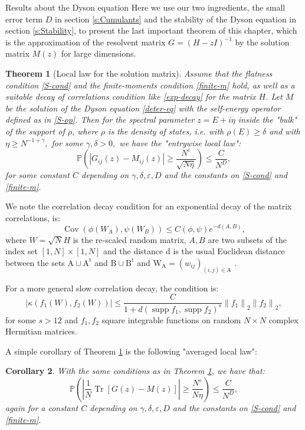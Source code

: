\documentclass[11pt, a4paper, oneside]{book}
\numberwithin{equation}{chapter}
\newcommand{\beq}{\begin{equation}}
\newcommand{\eeq}{\end{equation}}
\newtheorem{thm}{Theorem}[section]
\newtheorem{cor}[thm]{Corollary}
\begin{document}
\begin{section}{Results about the Dyson equation}
Here we use our two ingredients, the small error term $D$ in section \ref{s:Cumulants} and the stability of the Dyson equation in section \ref{s:Stability}, to present the last important theorem of this chapter, which is the approximation of the resolvent matrix $G = (H-zI)^{-1}$ by the solution matrix $M(z)$ for large dimensions.
%
\begin{thm}[Local law for the solution matrix] \label{local-entry}
    Assume that the flatness condition \eqref{S-cond} and the finite-moments condition \eqref{finite-m} hold, as well as a suitable decay of correlations condition like \eqref{exp-decay} for the matrix $H$. Let $M$ be the solution of the Dyson equation \eqref{deter-eq} with the self-energy operator defined as in \eqref{S-op}. Then for the spectral parameter $z=E+i\eta$ inside the "bulk" of the support of $\rho$, where $\rho$ is the density of states, i.e. with $\rho(E) \geq \delta$ and with $\eta \geq N^{-1+\gamma},$ for some $\gamma, \delta > 0,$ we have the "entrywise local law":
    \beq 
    \mathbb{P}\left(\left|G_{i j}(z)-M_{i j}(z)\right| \geq \frac{N^{\varepsilon}}{\sqrt{N \eta}}\right) \leq \frac{C}{N^D},
    \eeq
    for some constant $C$ depending on $\gamma, \delta, \varepsilon, D$ and the constants on \eqref{S-cond} and \eqref{finite-m}.
\end{thm}
%

We note the correlation decay condition for an exponential decay of the matrix correlations, is:
\beq \label{exp-decay}
\operatorname{Cov}\left(\phi\left(W_A\right) , \psi\left(W_B\right)\right) \leq C(\phi, \psi) e^{-d(A, B)},
\eeq
 where $W=\sqrt{N} H$ is the re-scaled random matrix, $A, B$ are two subsets of the index set $[1, N ] \times [1, N]$ and the distance $\mathrm{d}$ is the usual Euclidean distance between the sets $\mathrm{A} \cup \mathrm{A}^{\mathrm{t}}$ and $\mathrm{B} \cup \mathrm{B}^{\mathrm{t}}$ and $\mathrm{W}_{\mathrm{A}}=\left(w_{i j}\right)_{(i, j) \in \mathrm{A}}$ .

For a more general slow correlation decay, the condition is:
%
\beq \label{slow-decay}
\left|\kappa\left(f_1(W), f_2(W)\right)\right| \leq \frac{C}{1+d\left(\operatorname{supp} f_1, \operatorname{supp} f_2\right)^s}\left\|f_1\right\|_2\left\|f_2\right\|_2,
\eeq
%
for some $s>12$ and $f_1,f_2$ square integrable functions on random $N \times N$ complex Hermitian matrices.


A simple corollary of Theorem \ref{local-entry} is the following "averaged local law":
\begin{cor} \label{local-average}
    With the same conditions as in Theorem \ref{local-entry}, we have that:
    \beq
        \mathbb{P}\left(\left|\frac{1}{N} \operatorname{Tr}[G(z)-M(z)]\right| \geq \frac{N^{\varepsilon}}{N\eta}\right) \leq \frac{C}{N^D},
    \eeq
    again for a constant $C$ depending on $\gamma, \delta, \varepsilon, D$ and the constants on \eqref{S-cond} and \eqref{finite-m}.
\end{cor}


\end{section}
\end{document}
